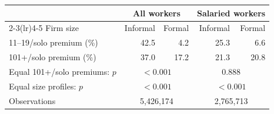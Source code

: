 \begin{tabular}{lrrrr}
\toprule
    & \multicolumn{2}{c}{All workers} & \multicolumn{2}{c}{Salaried workers} \\
    \cmidrule(lr){2-3}\cmidrule(lr){4-5}
    Firm size & Informal & Formal & Informal & Formal \\
    \midrule

    11--19/solo premium (\%) & 42.5 & 4.2 & 25.3 & 6.6 \\
101+/solo premium (\%) & 37.0 & 17.2 & 21.3 & 20.8 \\
Equal 101+/solo premiums: $p$ & \multicolumn{2}{c}{$<0.001$} & \multicolumn{2}{c}{0.888} \\
Equal size profiles: $p$ & \multicolumn{2}{c}{$<0.001$} & \multicolumn{2}{c}{$<0.001$} \\
Observations & \multicolumn{2}{c}{5,426,174} & \multicolumn{2}{c}{2,765,713}\\
\bottomrule\end{tabular}
